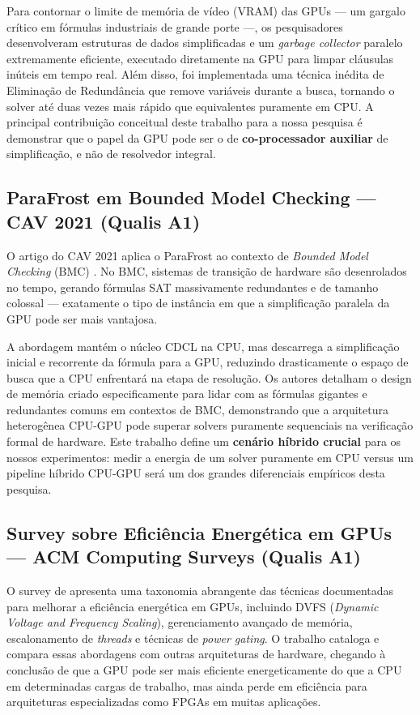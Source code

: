 \documentclass[12pt]{article}
\begin{document}
Para contornar o limite de memória de vídeo (VRAM) das GPUs — um gargalo crítico em fórmulas industriais de grande porte —, os pesquisadores desenvolveram estruturas de dados simplificadas e um \textit{garbage collector} paralelo extremamente eficiente, executado diretamente na GPU para limpar cláusulas inúteis em tempo real. Além disso, foi implementada uma técnica inédita de Eliminação de Redundância que remove variáveis durante a busca, tornando o solver até duas vezes mais rápido que equivalentes puramente em CPU. A principal contribuição conceitual deste trabalho para a nossa pesquisa é demonstrar que o papel da GPU pode ser o de \textbf{co-processador auxiliar} de simplificação, e não de resolvedor integral.

\subsection{ParaFrost em Bounded Model Checking — CAV 2021 (Qualis A1)}

O artigo do CAV 2021 aplica o ParaFrost ao contexto de \textit{Bounded Model Checking} (BMC) \cite{parafrost:cav:2021}. No BMC, sistemas de transição de hardware são desenrolados no tempo, gerando fórmulas SAT massivamente redundantes e de tamanho colossal — exatamente o tipo de instância em que a simplificação paralela da GPU pode ser mais vantajosa.

A abordagem mantém o núcleo CDCL na CPU, mas descarrega a simplificação inicial e recorrente da fórmula para a GPU, reduzindo drasticamente o espaço de busca que a CPU enfrentará na etapa de resolução. Os autores detalham o design de memória criado especificamente para lidar com as fórmulas gigantes e redundantes comuns em contextos de BMC, demonstrando que a arquitetura heterogênea CPU-GPU pode superar solvers puramente sequenciais na verificação formal de hardware. Este trabalho define um \textbf{cenário híbrido crucial} para os nossos experimentos: medir a energia de um solver puramente em CPU versus um pipeline híbrido CPU-GPU será um dos grandes diferenciais empíricos desta pesquisa.

\subsection{Survey sobre Eficiência Energética em GPUs — ACM Computing Surveys (Qualis A1)}

O survey de \cite{mittal:2015} apresenta uma taxonomia abrangente das técnicas documentadas para melhorar a eficiência energética em GPUs, incluindo DVFS (\textit{Dynamic Voltage and Frequency Scaling}), gerenciamento avançado de memória, escalonamento de \textit{threads} e técnicas de \textit{power gating}. O trabalho cataloga e compara essas abordagens com outras arquiteturas de hardware, chegando à conclusão de que a GPU pode ser mais eficiente energeticamente do que a CPU em determinadas cargas de trabalho, mas ainda perde em eficiência para arquiteturas especializadas como FPGAs em muitas aplicações.
\end{document}
